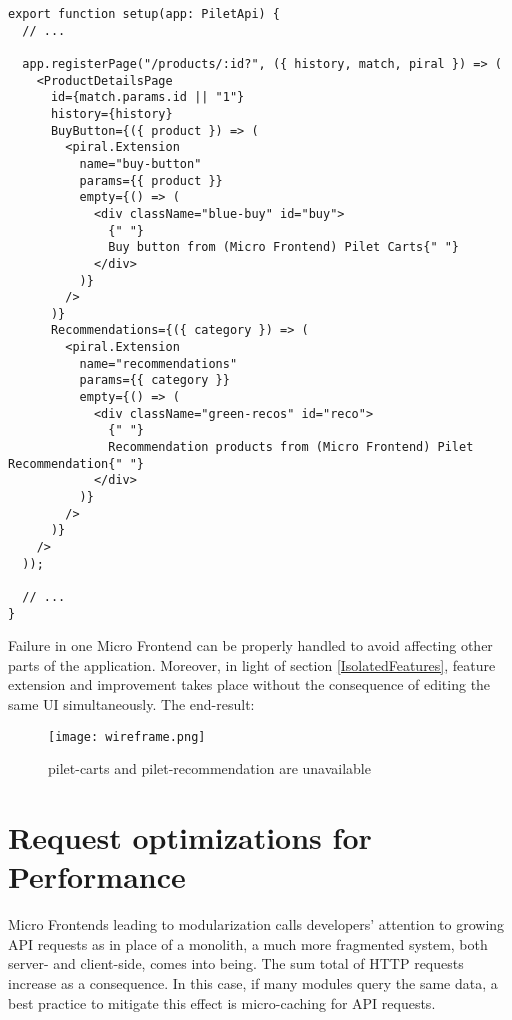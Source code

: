 \documentclass[a4paper]{book}
\begin{document}
\begin{lstlisting}[caption={pilet-products index.tsx}]
  export function setup(app: PiletApi) {
  // ...

  app.registerPage("/products/:id?", ({ history, match, piral }) => (
    <ProductDetailsPage
      id={match.params.id || "1"}
      history={history}
      BuyButton={({ product }) => (
        <piral.Extension
          name="buy-button"
          params={{ product }}
          empty={() => (
            <div className="blue-buy" id="buy">
              {" "}
              Buy button from (Micro Frontend) Pilet Carts{" "}
            </div>
          )}
        />
      )}
      Recommendations={({ category }) => (
        <piral.Extension
          name="recommendations"
          params={{ category }}
          empty={() => (
            <div className="green-recos" id="reco">
              {" "}
              Recommendation products from (Micro Frontend) Pilet Recommendation{" "}
            </div>
          )}
        />
      )}
    />
  ));

  // ...
}
\end{lstlisting}

Failure in one Micro Frontend can be properly handled to avoid affecting other parts of the application. Moreover, in light of section \ref{IsolatedFeatures}, feature extension and improvement takes place without the consequence
of editing the same UI simultaneously. The end-result:

\begin{figure}[h!]
  \centering
  \captionsetup{justification=centering}
  \texttt{[image: wireframe.png]}
  \caption{pilet-carts and pilet-recommendation are unavailable}
  \label{fig:wireframe1}
\end{figure}

\section{Request optimizations for Performance}
Micro Frontends leading to modularization calls developers’ attention to growing API requests as in place of a monolith, a much more fragmented system, both server- and client-side, comes into being. The sum total of HTTP requests increase as a consequence. In this case, if many modules query the same data, a best practice to mitigate this effect is micro-caching for API requests. \cite{Rap20}
\end{document}
